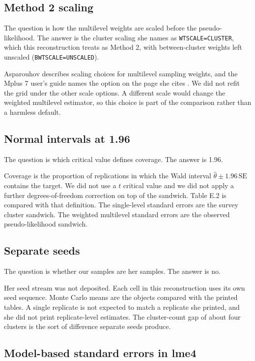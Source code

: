 \subsection{Method 2 scaling}

The question is how the multilevel weights are scaled before the
pseudo-likelihood.
The answer is the cluster scaling she names as \texttt{WTSCALE=CLUSTER},
which this reconstruction treats as Method 2, with between-cluster weights
left unscaled (\texttt{BWTSCALE=UNSCALED}).

Asparouhov describes scaling choices for multilevel sampling weights, and the
Mplus 7 user's guide names the option on the page she cites
\citep{asparouhov2006,muthen2012,rabehesketh2006}.
We did not refit the grid under the other scale options.
A different scale would change the weighted multilevel estimator, so this
choice is part of the comparison rather than a harmless default.

\subsection{Normal intervals at 1.96}

The question is which critical value defines coverage.
The answer is 1.96.

Coverage is the proportion of replications in which the Wald interval
$\hat\theta\pm 1.96\,\mathrm{SE}$ contains the target.
We did not use a $t$ critical value and we did not apply a further
degrees-of-freedom correction on top of the sandwich.
Table E.2 is compared with that definition.
The single-level standard errors are the survey cluster sandwich.
The weighted multilevel standard errors are the observed pseudo-likelihood
sandwich.

\subsection{Separate seeds}

The question is whether our samples are her samples.
The answer is no.

Her seed stream was not deposited.
Each cell in this reconstruction uses its own seed sequence.
Monte Carlo means are the objects compared with the printed tables.
A single replicate is not expected to match a replicate she printed, and she
did not print replicate-level estimates.
The cluster-count gap of about four clusters is the sort of difference
separate seeds produce.

\subsection{Model-based standard errors in lme4}

